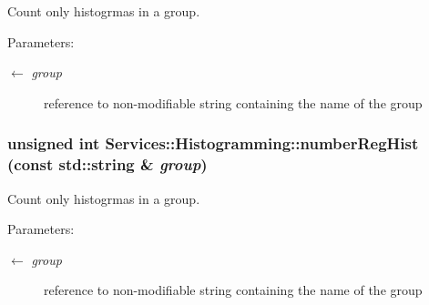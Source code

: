 Count only histogrmas in a group. 

\begin{Desc}
\item[Parameters:]
\begin{description}
\item[\mbox{$\leftarrow$} {\em group}]reference to non-modifiable string containing the name of the group \end{description}
\end{Desc}
\hypertarget{namespaceServices_1_1Histogramming_4731840672ebd592faf176c87a187c72}{
\subsubsection[numberRegHist]{\setlength{\rightskip}{0pt plus 5cm}unsigned int Services::Histogramming::number\-Reg\-Hist (const std::string \& {\em group})}}
\label{namespaceServices_1_1Histogramming_4731840672ebd592faf176c87a187c72}


Count only histogrmas in a group. 

\begin{Desc}
\item[Parameters:]
\begin{description}
\item[\mbox{$\leftarrow$} {\em group}]reference to non-modifiable string containing the name of the group \end{description}
\end{Desc}
